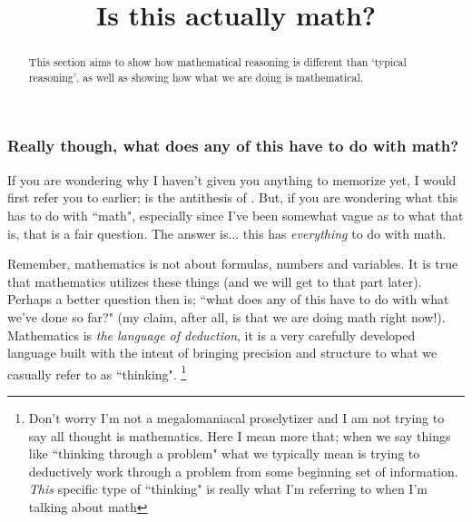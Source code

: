\documentclass{ximeraXloud}
\title{Is this actually math?}
\begin{document}
\begin{abstract}
    This section aims to show how mathematical reasoning is different than `typical reasoning', as well as showing how what we are doing is mathematical.
\end{abstract}
\maketitle

\subsubsection*{Really though, what does any of this have to do with math?}
    \begin{exploration}
        If you are wondering why I haven't given you anything to memorize yet, I would first refer you to earlier;  is the antithesis of . But, if you are wondering what this has to do with ``math", especially since I've been somewhat vague as to what that is, that is a fair question. The answer is... this has \textit{everything} to do with math.
        
        Remember, mathematics is not about formulas, numbers and variables. It is true that mathematics utilizes these things (and we will get to that part later). Perhaps a better question then is; ``what does any of this have to do with what we've done so far?" (my claim, after all, is that we are doing math right now!). Mathematics is \textit{the language of deduction}, it is a very carefully developed language built with the intent of bringing precision and structure to what we casually refer to as ``thinking".%
        \footnote{Don't worry I'm not a megalomaniacal proselytizer and I am not trying to say all thought is mathematics. Here I mean more that; when we say things like ``thinking through a problem" what we typically mean is trying to deductively work through a problem from some beginning set of information. \textit{This} specific type of ``thinking" is really what I'm referring to when I'm talking about math}
    \end{exploration}
    
\end{document}
